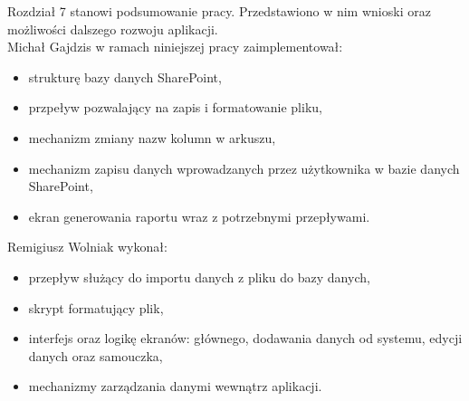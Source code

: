 \noindent Rozdział 7 stanowi podsumowanie pracy. Przedstawiono w nim wnioski oraz możliwości dalszego rozwoju aplikacji.\\

\vspace{0.5cm}
\noindent Michał Gajdzis w ramach niniejszej pracy zaimplementował:
\begin{itemize}
    \item strukturę bazy danych SharePoint,
    \item przpeływ pozwalający na zapis i formatowanie pliku,
    \item mechanizm zmiany nazw kolumn w arkuszu,
    \item mechanizm zapisu danych wprowadzanych przez użytkownika w bazie danych SharePoint,
    \item ekran generowania raportu wraz z potrzebnymi przepływami.
\end{itemize}

\vspace{0.5cm}
\noindent Remigiusz Wolniak wykonał:
\begin{itemize}
    \item przepływ służący do importu danych z pliku do bazy danych,
    \item skrypt formatujący plik,
    \item interfejs oraz logikę ekranów: głównego, dodawania danych od systemu, edycji danych oraz samouczka,
    \item mechanizmy zarządzania danymi wewnątrz aplikacji.
\end{itemize}